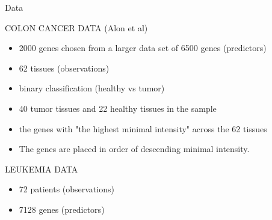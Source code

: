 \documentclass[8pt]{beamer}
\begin{document}
\begin{frame}{Data}

COLON CANCER DATA (Alon et al)
\begin{itemize}
    \item 2000 genes chosen from a larger data set of 6500 genes (predictors)
    \item 62 tissues (observations) 
    \item binary classification (healthy vs tumor)
    \item 40 tumor tissues and 22 healthy tissues in the sample
    \item the genes with "the highest minimal intensity" across the 62 tissues
    \item The genes are placed in order of descending minimal intensity.
\end{itemize}

\noindent 
LEUKEMIA DATA
\begin{itemize}
    \item 72 patients (observations)
    \item 7128 genes (predictors)
    
\end{itemize}
\end{frame}
\end{document}
